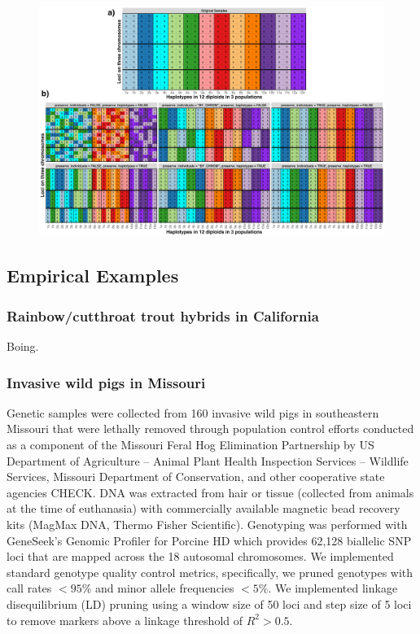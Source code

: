 {\begin{figure}
\includegraphics[width=\textwidth]{figures/permutations-plot.png}
\caption[\permcap]{\permcap}
\end{figure}

\subsection*{Empirical Examples}

\subsubsection*{Rainbow/cutthroat trout hybrids in California}

Boing.

\subsubsection*{Invasive wild pigs in Missouri}

Genetic samples were collected from 160 invasive wild pigs in 
southeastern Missouri that were lethally removed through population control efforts conducted 
as a component of the Missouri Feral Hog Elimination Partnership
by US Department of Agriculture – Animal Plant Health Inspection Services – Wildlife Services, Missouri Department of Conservation, 
and other cooperative state agencies CHECK.
DNA was extracted from hair or tissue (collected from animals at the time of euthanasia) with 
commercially available magnetic bead recovery kits (MagMax DNA, Thermo Fisher Scientific).
Genotyping was performed with GeneSeek’s Genomic Profiler for Porcine HD which provides 
62,128 biallelic SNP loci that are mapped across the 18 autosomal chromosomes.
We implemented standard genotype quality control metrics, specifically, we pruned genotypes with 
call rates $<95\%$ and minor allele frequencies $<5\%$.
We implemented linkage disequilibrium (LD) pruning using a window size of 50 loci and step size 
of 5 loci to remove markers above a linkage threshold of $R^2 > 0.5$.

}
